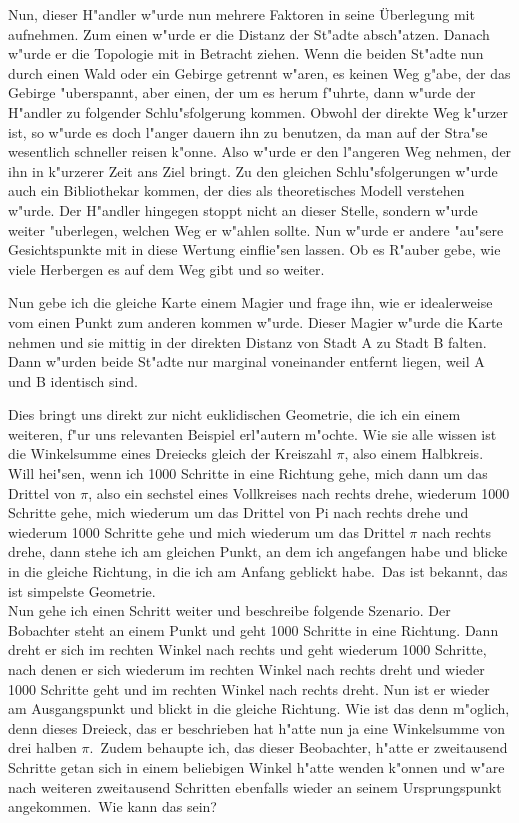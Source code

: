 \documentclass[a5paper,8pt]{book}
\begin{document}
Nun, dieser H"andler w"urde nun mehrere Faktoren in seine Überlegung mit aufnehmen. Zum einen w"urde er die Distanz der St"adte absch"atzen. Danach w"urde er die Topologie 
mit in Betracht ziehen. Wenn die beiden St"adte nun durch einen Wald oder ein Gebirge getrennt w"aren, es keinen Weg g"abe, der das Gebirge "uberspannt, aber einen, der um 
es herum f"uhrte, dann w"urde der H"andler zu folgender Schlu"sfolgerung kommen. Obwohl der direkte Weg k"urzer ist, so w"urde es doch l"anger dauern ihn zu benutzen, da 
man auf der Stra"se wesentlich schneller reisen k"onne. Also w"urde er den l"angeren Weg nehmen, der ihn in k"urzerer Zeit ans Ziel bringt.
Zu den gleichen Schlu"sfolgerungen w"urde auch ein Bibliothekar kommen, der dies als theoretisches Modell verstehen w"urde. Der H"andler hingegen stoppt nicht an dieser 
Stelle, sondern w"urde weiter "uberlegen, welchen Weg er w"ahlen sollte. Nun w"urde er andere "au"sere Gesichtspunkte mit in diese Wertung einflie"sen lassen. Ob es R"auber 
gebe, wie viele Herbergen es auf dem Weg gibt und so weiter.

Nun gebe ich die gleiche Karte einem Magier und frage ihn, wie er idealerweise vom einen Punkt zum anderen kommen w"urde. Dieser Magier w"urde die Karte nehmen und sie 
mittig in der direkten Distanz von Stadt A zu Stadt B falten. Dann w"urden beide St"adte nur marginal voneinander entfernt liegen, weil A und B identisch sind.

Dies bringt uns direkt zur nicht euklidischen Geometrie, die ich ein einem weiteren, f"ur uns relevanten Beispiel erl"autern m"ochte. Wie sie alle wissen ist die 
Winkelsumme eines Dreiecks gleich der Kreiszahl $\pi$, also einem Halbkreis. Will hei"sen, wenn ich 1000 Schritte in eine Richtung gehe, mich dann um das Drittel von $\pi$, 
also ein sechstel eines Vollkreises nach rechts drehe, wiederum 1000 Schritte gehe, mich wiederum um das Drittel von Pi nach rechts drehe und wiederum 1000 Schritte 
gehe und mich wiederum um das Drittel $\pi$ nach rechts drehe, dann stehe ich am gleichen Punkt, an dem ich angefangen habe und blicke in die gleiche Richtung, in die ich 
am Anfang geblickt habe.\
Das ist bekannt, das ist simpelste Geometrie.\\

Nun gehe ich einen Schritt weiter und beschreibe folgende Szenario. Der Bobachter steht an einem Punkt und geht 1000 Schritte in eine Richtung. Dann dreht er sich im rechten 
Winkel nach rechts und geht wiederum 1000 Schritte, nach denen er sich wiederum im rechten Winkel nach rechts dreht und wieder 1000 Schritte geht und im rechten Winkel nach 
rechts dreht. Nun ist er wieder am Ausgangspunkt und blickt in die gleiche Richtung. Wie ist das denn m"oglich, denn dieses Dreieck, das er beschrieben hat h"atte nun ja 
eine Winkelsumme von drei halben $\pi$.\
Zudem behaupte ich, das dieser Beobachter, h"atte er zweitausend Schritte getan sich in einem beliebigen Winkel h"atte wenden k"onnen und w"are nach weiteren zweitausend 
Schritten ebenfalls wieder an seinem Ursprungspunkt angekommen.\
Wie kann das sein?\\
\end{document}
